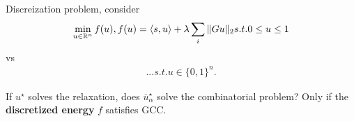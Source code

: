 \begin{remark}
  Discreization problem, consider
  \begin{align}
    \label{eq:124}
    \min_{u \in \R^{n}} f(u), f(u) = \IP{s, u} + \lambda \sum_{i} \| G
    u \|_{2} s.t. 0 \leq u \leq 1
  \end{align} vs
  \begin{align}
    \label{eq:125}
    ... s.t. u \in \{ 0, 1 \}^{n}.
  \end{align}

  If $u^{\star}$ solves the relaxation, does $\overline
  u^{\star}_{\alpha}$ solve the combinatorial problem?  Only if the
  \textbf{discretized energy} $f$ satisfies GCC.


\end{remark}


